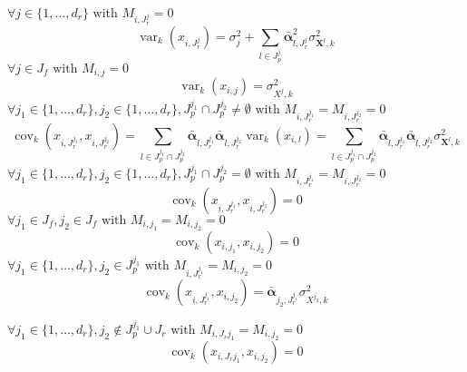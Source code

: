 \documentclass[12pt,a4paper]{report}
\begin{document}
$\forall j \in \{1,\dots,d_r\} \textrm{ with } M_{i,J_r^j}=0$ 
	\begin{equation}
		\operatorname{var}_{k}(x_{i,J_r^j})=\sigma_{j}^2+ \sum_{l \in J_p^j} \bar{\boldsymbol{\alpha}}_{l,J_r^j}^2\sigma_{\boldsymbol{X}^l,k}^2
	\end{equation}			
	$\forall j \in J_f \textrm{ with } M_{i,j}=0$
\begin{equation}
	\operatorname{var}_{k}(x_{i,j})=\sigma_{X^j,k}^2
\end{equation}		
	$\forall j_1 \in \{1,\dots,d_r\}, j_2 \in \{1,\dots,d_r\},J_p^{j_1}\cap J_p^{j_2}\neq \emptyset \textrm{ with } M_{i,J_r^{j_1}}=M_{i,J_r^{j_2}}=0$
	\begin{equation}
		\operatorname{cov}_{k}(x_{i,J_r^{j_1}},x_{i,J_r^{j_2}})=\sum_{l\in J_p^{j_1}\cap J_p^{j_2}}\bar{\boldsymbol{\alpha}}_{l,J_r^{j_1}}\bar{\boldsymbol{\alpha}}_{l,J_r^{j_2}}	\operatorname{var}_{k}(x_{i,l})
		 =\sum_{l\in J_p^{j_1}\cap J_p^{j_2}}\bar{\boldsymbol{\alpha}}_{l,J_r^{j_1}}\bar{\boldsymbol{\alpha}}_{l,J_r^{j_2}}\sigma_{\boldsymbol{X}^l,k}^2
	\end{equation}
	$\forall j_1 \in \{1,\dots,d_r\}, j_2 \in \{1,\dots,d_r\},J_p^{j_1}\cap J_p^{j_2}= \emptyset \textrm{ with } M_{i,J_r^{j_1}}=M_{i,J_r^{j_2}}=0$
	\begin{equation}
	\operatorname{cov}_{k}(x_{i,J_r^{j_1}},x_{i,J_r^{j_2}})=0
\end{equation}
	$\forall j_1 \in J_f, j_2 \in J_f \textrm{ with } M_{i,j_1}=M_{i,j_2}=0$
	\begin{equation}
	\operatorname{cov}_{k}(x_{i,j_1},x_{i,j_2})=0
\end{equation}
	$\forall j_1 \in \{1,\dots,d_r\}, j_2 \in J_p^{j_1} \textrm{ with } M_{i,J_r^{j_1}}=M_{i,j_2}=0$
	\begin{equation}
	\operatorname{cov}_{k}(x_{i,J_r^{j_1}},x_{i,j_2})= \bar{\boldsymbol{\alpha}}_{j_2,J_r^{j_1}}\sigma_{X^{j_2},k}^2
\end{equation}


$\forall j_1 \in \{1,\dots,d_r\}, j_2 \notin J_p^{j_1}\cup J_r \textrm{ with } M_{i,J_r{j_1}}=M_{i,j_2}=0$
	\begin{equation}
	\operatorname{cov}_{k}(x_{i,J_r{j_1}},x_{i,j_2})= 0
\end{equation}
\end{document}
